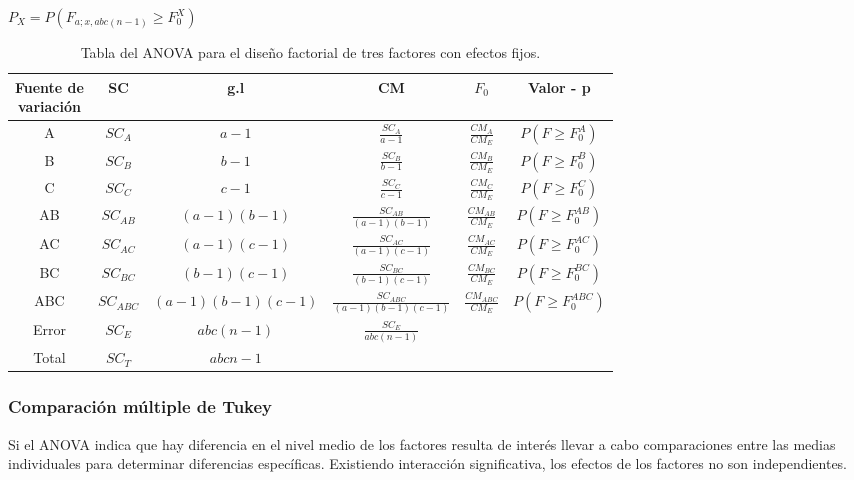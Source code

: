 \begin{center}
	$ P_{X} =  P( F_{a;x,abc(n-1)} \geq F_{0}^{X} ) $\\
\end{center}


\begin{table}
	\centering
	\begin{tabular}{|c|c|c|c|c|c|}
		\hline
		\makecell{Fuente de \\ variación} & SC & g.l & CM & $F_{0}$ & Valor - p \\ %
		\hline
		A & $SC_{A}$ & $a-1$ & $\frac{SC_{A}}{a-1}$ &  $\frac{CM_{A}}{CM_{E}}$ & $P(F \geq F_{0}^{A} )$ \\
		\hline
		B & $SC_{B}$ & $b-1$ & $\frac{SC_{B}}{b-1}$ &  $\frac{CM_{B}}{CM_{E}}$ & $P(F \geq F_{0}^{B} )$ \\
		\hline
		C & $SC_{C}$ & $c-1$ & $\frac{SC_{C}}{c-1}$ &  $\frac{CM_{C}}{CM_{E}}$ & $P(F \geq F_{0}^{C} )$ \\
		\hline
		AB & $SC_{AB}$ & $(a-1)(b-1)$ & $\frac{SC_{AB}}{(a-1)(b-1)}$ &  $\frac{CM_{AB}}{CM_{E}}$ & $P(F \geq F_{0}^{AB} )$ \\
		\hline
		AC & $SC_{AC}$ & $(a-1)(c-1)$ & $\frac{SC_{AC}}{(a-1)(c-1)}$ &  $\frac{CM_{AC}}{CM_{E}}$ & $P(F \geq F_{0}^{AC} )$ \\
		\hline
		BC & $SC_{BC}$ & $(b-1)(c-1) $ & $\frac{SC_{BC}}{(b-1)(c-1)}$ &  $\frac{CM_{BC}}{CM_{E}}$ & $P(F \geq F_{0}^{BC} )$ \\
		\hline
		ABC & $SC_{ABC}$ & $(a-1)(b-1)(c-1)$ & $\frac{SC_{ABC}}{(a-1)(b-1)(c-1)}$ &  $\frac{CM_{ABC}}{CM_{E}}$ & $P(F \geq F_{0}^{ABC} )$ \\
		\hline
		Error & $SC_{E} $ & $abc(n-1)$ & $\frac{SC_{E}}{abc(n-1)}$ & & \\
		\hline
		Total & $SC_{T}$ & $abcn-1$ & & &  \\
		\hline
	\end{tabular}
	\caption{Tabla del ANOVA para el diseño factorial de tres factores con efectos fijos.}
\end{table}
\FloatBarrier

\subsubsection{Comparación múltiple de Tukey}

Si el ANOVA indica que hay diferencia en el nivel medio de los factores resulta de interés llevar a cabo comparaciones entre las medias individuales para determinar diferencias específicas. Existiendo interacción significativa, los efectos de los factores no son independientes.\\


